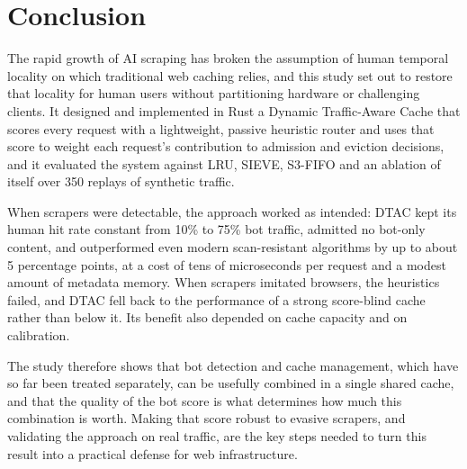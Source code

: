 \section{Conclusion}
The rapid growth of AI scraping has broken the assumption of human temporal locality on which traditional web caching relies, and this study set out to restore that locality for human users without partitioning hardware or challenging clients. It designed and implemented in Rust a Dynamic Traffic-Aware Cache that scores every request with a lightweight, passive heuristic router and uses that score to weight each request's contribution to admission and eviction decisions, and it evaluated the system against LRU, SIEVE, S3-FIFO and an ablation of itself over 350 replays of synthetic traffic.

When scrapers were detectable, the approach worked as intended: DTAC kept its human hit rate constant from 10\% to 75\% bot traffic, admitted no bot-only content, and outperformed even modern scan-resistant algorithms by up to about 5 percentage points, at a cost of tens of microseconds per request and a modest amount of metadata memory. When scrapers imitated browsers, the heuristics failed, and DTAC fell back to the performance of a strong score-blind cache rather than below it. Its benefit also depended on cache capacity and on calibration.

The study therefore shows that bot detection and cache management, which have so far been treated separately, can be usefully combined in a single shared cache, and that the quality of the bot score is what determines how much this combination is worth. Making that score robust to evasive scrapers, and validating the approach on real traffic, are the key steps needed to turn this result into a practical defense for web infrastructure.
